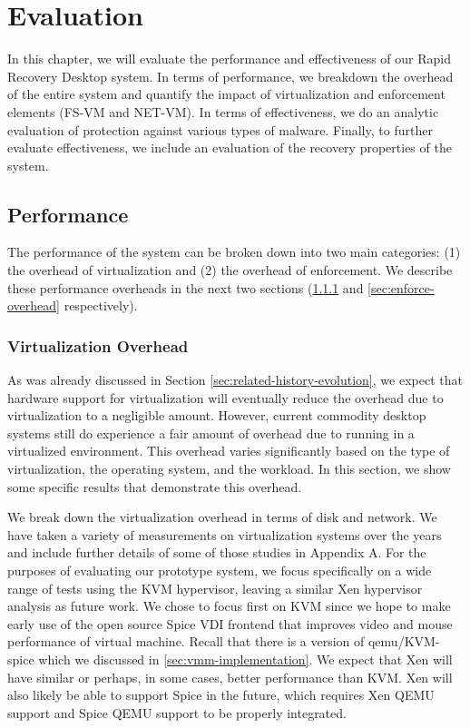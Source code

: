 \chapter{Evaluation} 

In this chapter, we will evaluate the performance and effectiveness of our Rapid Recovery Desktop system. In terms of performance, we breakdown the overhead of the entire system and quantify the impact of virtualization and enforcement elements (FS-VM and NET-VM). In terms of effectiveness, we do an analytic evaluation of protection against various types of malware. Finally, to further evaluate effectiveness, we include an evaluation of the recovery properties of the system.

\section{Performance}

The performance of the system can be broken down into two main categories: (1) the overhead of virtualization and (2) the overhead of enforcement. We describe these performance overheads in the next two sections (\ref{sec:virt-overhead} and \ref{sec:enforce-overhead} respectively).

\subsection{Virtualization Overhead}
\label{sec:virt-overhead}

As was already discussed in Section \ref{sec:related-history-evolution}, we expect that hardware support for virtualization will eventually reduce the overhead due to virtualization to a negligible amount. However, current commodity desktop systems still do experience a fair amount of overhead due to running in a virtualized environment. This overhead varies significantly based on the type of virtualization, the operating system, and the workload. In this section, we show some specific results that demonstrate this overhead.

We break down the virtualization overhead in terms of disk and network. We have taken a variety of measurements on virtualization systems over the years and include further details of some of those studies in Appendix A. For the purposes of evaluating our prototype system, we focus specifically on a wide range of tests using the KVM hypervisor, leaving a similar Xen hypervisor analysis as future work. We chose to focus first on KVM since we hope to make early use of the open source Spice VDI frontend that improves video and mouse performance of virtual machine. Recall that there is a version of qemu/KVM-spice which we discussed in \ref{sec:vmm-implementation}. We expect that Xen will have similar or perhaps, in some cases, better performance than KVM. Xen will also likely be able to support Spice in the future, which requires Xen QEMU support and Spice QEMU support to be properly integrated.

